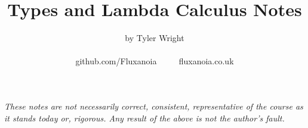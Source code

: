 \documentclass[a4paper, 12pt, twoside]{article}
\begin{document}
\title{Types and Lambda Calculus Notes}
\date{}
\author{by Tyler Wright \\
  \\
  github.com/Fluxanoia $\qquad$ fluxanoia.co.uk
}
\maketitle

\vfill

\textit{These notes are not necessarily correct,
consistent, representative of the course as it stands today or, 
rigorous. Any result of the above is not the author's fault.}

% 

\newpage

\tableofcontents


\end{document}
